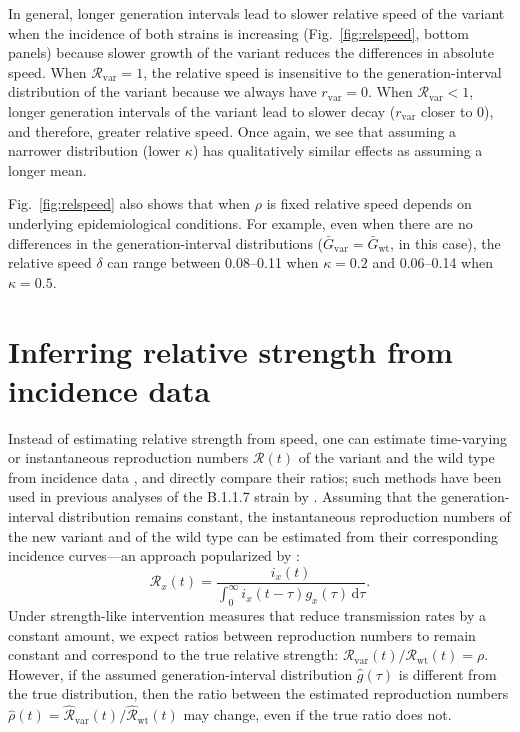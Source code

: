 \documentclass[12pt]{article}
\newcommand{\fref}[1]{Fig.~\ref{fig:#1}}
\newcommand{\vvvar}{\mathrm{var}}
\newcommand{\wwwt}{\mathrm{wt}}
\newcommand{\rx}[1]{\ensuremath{{r}_{#1}}\xspace}
\newcommand{\rv}{\rx{\vvvar}}
\newcommand{\Rx}[1]{\ensuremath{{\mathcal R}_{#1}}\xspace}
\newcommand{\RR}{\ensuremath{{\mathcal R}}\xspace}
\newcommand{\Rw}{\Rx{\wwwt}}
\newcommand{\Rv}{\Rx{\vvvar}}
\newcommand{\dd}[1]{\ensuremath{\, \mathrm{d}#1}}
\newcommand{\dtau}{\dd{\tau}}
\newcommand{\Gx}[1]{\ensuremath{{\bar G}_{#1}}\xspace}
\newcommand{\Gw}{\Gx{\wwwt}}
\newcommand{\Gv}{\Gx{\vvvar}}
\begin{document}
In general, longer generation intervals lead to slower relative speed of the variant when the incidence of both strains is increasing (\fref{relspeed}, bottom panels) because slower growth of the variant reduces the differences in absolute speed.
When $\Rv=1$, the relative speed is insensitive to the generation-interval distribution of the variant because we always have $\rv=0$.
When $\Rv<1$, longer generation intervals of the variant lead to slower decay ($\rv$ closer to 0), and therefore, greater relative speed.
Once again, we see that assuming a narrower distribution (lower $\kappa$) has qualitatively similar effects as assuming a longer mean.

\fref{relspeed} also shows that when $\rho$ is fixed relative speed depends on underlying epidemiological conditions. 
For example, even when there are no differences in the generation-interval distributions ($\Gv=\Gw$, in this case), the relative speed $\delta$ can range between 0.08--0.11 when $\kappa=0.2$ and 0.06--0.14 when $\kappa=0.5$.

\section{Inferring relative strength from incidence data}

Instead of estimating relative strength from speed, one can estimate time-varying or instantaneous reproduction numbers $\RR(t)$ of the variant and the wild type from incidence data \citep{fraser2007estimating}, and directly compare their ratios;
such methods have been used in previous analyses of the B.1.1.7 strain by \cite{volz2021transmission}.
Assuming that the generation-interval distribution remains constant, the instantaneous reproduction numbers of the new variant and of the wild type can be estimated from their corresponding incidence curves---an approach popularized by \cite{cori2013new}:
\begin{equation}
\RR_x(t) = \frac{i_x(t)}{\int_0^\infty i_x(t-\tau) g_x(\tau) \dtau}.
\label{eq:rt}
\end{equation}
Under strength-like intervention measures that reduce transmission rates by a constant amount, we expect ratios between reproduction numbers to remain constant and correspond to the true relative strength: $\Rv(t)/\Rw(t) = \rho$.
However, if the assumed generation-interval distribution $\hat{g}(\tau)$ is different from the true distribution, then the ratio between the estimated reproduction numbers $\hat{\rho}(t) = \hat{\RR}_{\textrm{var}}(t)/\hat{\RR}_{\textrm{wt}}(t)$ may change, even if the true ratio does not.
\end{document}

